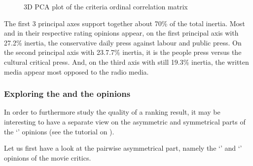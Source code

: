 \documentclass[a4paper,12pt,english]{sphinxhowto}
\let\sphinxpxdimen\pdfpxdimen\else\newdimen\sphinxpxdimen
\begin{document}
\begin{sphinxVerbatim}[commandchars=\\\{\}]
\end{sphinxVerbatim}

\begin{figure}[H]
\centering
\capstart

\noindent\sphinxincludegraphics[width=400\sphinxpxdimen]{{correlationPCA}.png}
\caption{3D PCA plot of the criteria ordinal correlation matrix}\label{\detokenize{pearls:correlationpca}}\end{figure}

\sphinxAtStartPar
The first 3 principal axes support together about 70\% of the total inertia. Most  and  in their respective rating opinions appear, on the first principal axis with 27.2\% inertia, the conservative daily press against labour and public press. On the second principal axis with 23.7.7\% inertia, it is the people press versus the cultural critical press. And, on the third axis with still 19.3\% inertia, the written media appear most opposed to the radio media.


\subsubsection{Exploring the   and the  opinions}
\label{\detokenize{pearls:exploring-the-better-rated-and-the-as-well-as-rated-opinions}}
\sphinxAtStartPar
In order to furthermore study the quality of a ranking result, it may be interesting to have a separate view on the asymmetric and symmetrical parts of the ‘’ opinions (see the tutorial on ).

\sphinxAtStartPar
Let us first have a look at the pairwise asymmetrical part, namely the ‘’ and ‘’ opinions of the movie critics.

\begin{sphinxVerbatim}[commandchars=\\\{\}]
 
  
\end{sphinxVerbatim}
\end{document}
